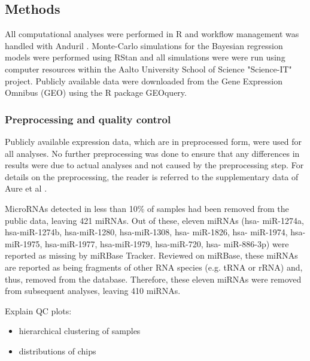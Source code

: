 


\subsection{Methods}

All computational analyses were performed in R \citep{R} and workflow
management was handled with Anduril \citep{OvaskaXXXX}. Monte-Carlo
simulations for the Bayesian regression models were performed using RStan
\citep{stan} and all simulations were were run using computer
resources within the Aalto University School of Science "Science-IT"
project. Publicly available data were downloaded from the
Gene Expression Omnibus (GEO) using the R package GEOquery.




\subsubsection{Preprocessing and quality control}

Publicly available expression data, which are in preprocessed form, were used
for all analyses. No further preprocessing was done to ensure that any
differences in results were due to actual analyses and not caused by the
preprocessing step. For details on the preprocessing, the reader is referred
to the supplementary data of Aure et al \citep{Aure2015}.

MicroRNAs detected in less than 10\% of samples had been removed from the
public data, leaving 421 miRNAs. Out of these, eleven miRNAs (hsa-
miR-1274a, hsa-miR-1274b, hsa-miR-1280, hsa-miR-1308, hsa- miR-1826, hsa-
miR-1974, hsa-miR-1975, hsa-miR-1977, hsa-miR-1979, hsa-miR-720, hsa-
miR-886-3p) were reported as missing by miRBase Tracker. Reviewed on miRBase,
these miRNAs are reported as being fragments of other RNA species (e.g. tRNA
or rRNA) and, thus, removed from the database. Therefore, these eleven miRNAs
were removed from subsequent analyses, leaving 410 miRNAs.

Explain QC plots:
\begin{itemize}
	\item hierarchical clustering of samples
	\item distributions of chips
\end{itemize}

